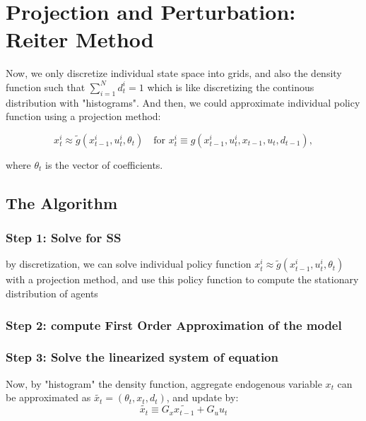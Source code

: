 \section{Projection and Perturbation: Reiter Method}

Now, we only {\color{red}discretize individual state space into grids}, and also the density function such that $\sum_{i=1}^{N} d^i_t = 1$ which is like discretizing the continous distribution with "histograms". And then, we could approximate individual policy function using a projection method:

\[ 
x^i_t \approx \tilde{g}(x^i_{t-1},u^i_t, \theta_t) \quad \text{for } x^i_t \equiv g(x^i_{t-1}, u^i_t, x_{t-1},u_t,d_{t-1}), 
\]

where $\theta_t$ is the vector of coefficients. 

\subsection{The Algorithm}

\subsubsection*{Step 1: Solve for SS}

by discretization, we can solve individual policy function $x^i_t \approx \tilde{g}(x^i_{t-1},u^i_t, \theta_t)$ with a projection method, and use this policy function to compute the stationary distribution of agents

\subsubsection*{Step 2: compute First Order Approximation of the model}

\subsubsection*{Step 3: Solve the linearized system of equation }
Now, by "histogram" the density function, aggregate endogenous variable $x_t$ can be approximated  as $\tilde{x_t} = (\theta_t, x_t, d_t)$, and update by:
\[ \tilde{x_t} \equiv G_x \tilde{x_{t-1}} + G_u u_t\]









 